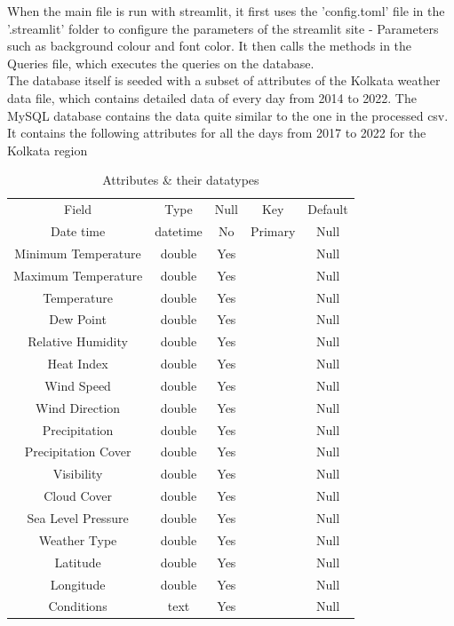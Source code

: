 \documentclass[12pt, a4paper]{article}
\begin{document}
    When the main file is run with streamlit, it first uses the 'config.toml' file in the '.streamlit' folder to configure the parameters of the streamlit site - Parameters such as background colour and font color. It then calls the methods in the Queries file, which executes the queries on the database.\\

    The database itself is seeded with a subset of attributes of the Kolkata weather data file, which contains detailed data of every day from 2014 to 2022. The MySQL database contains the data quite similar to the one in the processed csv.\\

    It contains the following attributes for all the days from 2017 to 2022 for the Kolkata region

    \begin{table}
        \centering
        \begin{tabular}{c|c|c|c|c}
            Field & Type & Null & Key & Default\\
            Date time & datetime & No & Primary & Null\\
            Minimum Temperature & double & Yes &  & Null\\
            Maximum Temperature & double & Yes &  & Null\\
            Temperature & double & Yes &  & Null\\
            Dew Point & double & Yes &  & Null\\
            Relative Humidity & double & Yes &  & Null\\
            Heat Index & double & Yes &  & Null\\
            Wind Speed & double & Yes &  & Null\\
            Wind Direction & double & Yes &  & Null\\
            Precipitation & double & Yes &  & Null\\
            Precipitation Cover & double & Yes &  & Null\\
            Visibility & double & Yes &  & Null\\
            Cloud Cover & double & Yes &  & Null\\
            Sea Level Pressure & double & Yes &  & Null\\
            Weather Type & double & Yes &  & Null\\
            Latitude & double & Yes &  & Null\\
            Longitude & double & Yes &  & Null\\
            Conditions & text & Yes &  & Null\\
        \end{tabular}
        \caption{Attributes \& their datatypes}
        \label{tab:my_label}
    \end{table}
 
\end{document}
